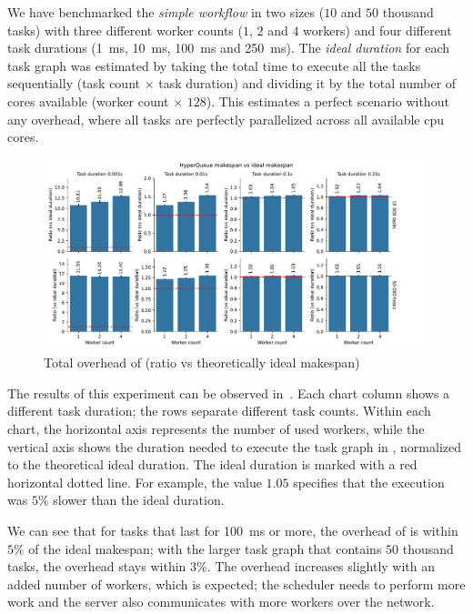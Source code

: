 We have benchmarked the \emph{simple workflow} in two sizes ($10$ and
$50$ thousand tasks) with three different worker counts ($1$,
$2$ and $4$ workers) and four different task durations
(\SI{1}{\milli\second}, \SI{10}{\milli\second}, \SI{100}{\milli\second} and
\SI{250}{\milli\second}). The \emph{ideal duration} for each task graph was estimated by taking
the total time to execute all the tasks sequentially (task count $\times$ task duration) and
dividing it by the total number of cores available (worker count $\times$ $128$). This estimates a
perfect scenario without any overhead, where all tasks are perfectly parallelized across all
available \gls{cpu} cores.

\begin{figure}[h]
	\centering
	\includegraphics[width=\textwidth]{imgs/hq/charts/total-overhead-vs-ideal}
	\caption{Total overhead of \hyperqueue{} (ratio vs theoretically ideal makespan)}
	\label{fig:hq-overhead-vs-ideal}
\end{figure}

The results of this experiment can be observed in~. Each chart column shows
a different task duration; the rows separate different task counts. Within each chart, the
horizontal axis represents the number of used workers, while the vertical axis shows the duration
needed to execute the task graph in \hyperqueue{}, normalized to the theoretical ideal
duration. The ideal duration is marked with a red horizontal dotted line. For example, the value
$1.05$ specifies that the \hyperqueue{} execution was
$5\%$ slower than the ideal duration.

We can see that for tasks that last for \SI{100}{\milli\second} or more, the overhead of
\hyperqueue{} is within $5\%$ of the ideal makespan; with the larger
task graph that contains $50$ thousand tasks, the overhead stays within
$3\%$. The overhead increases slightly with an added number of workers, which is
expected; the scheduler needs to perform more work and the server also communicates with more
workers over the network.

